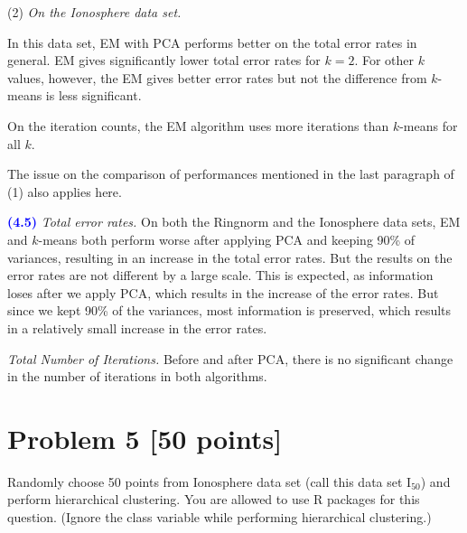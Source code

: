 \documentclass[a4paper,12pt]{article}
\newcommand{\qnum}[1]{\noindent\textcolor{blue}{\textbf{(#1)}}}
\newcommand{\km}{$k$-means }
\begin{document}
\noindent 
(2) \emph{On the Ionosphere data set.}

In this data set, EM with PCA performs better on the total error rates in general. EM gives significantly lower total error rates for $k=2$. For other $k$ values, however, the EM gives better error rates but not the difference from \km is less significant.

On the iteration counts, the EM algorithm uses more iterations than $k$-means for all $k$. 

The issue on the comparison of performances mentioned in the last paragraph of (1) also applies here.
\bigskip\bigskip





\qnum{4.5}
\emph{Total error rates.}
On both the Ringnorm and the Ionosphere data sets, 
EM and $k$-means both perform worse after applying PCA and keeping 90\% of variances, resulting in an increase in the total error rates. But the results on the error rates are not different by a large scale. This is expected, as information loses after we apply PCA, which results in the increase of the error rates. But since we kept 90\% of the variances, most information is preserved, which results in a relatively small increase in the error rates.

\emph{Total Number of Iterations.} 
Before and after PCA, there is no significant change in the number of iterations in both algorithms.































 \newpage
 \section*{Problem 5 [50 points]}  Randomly choose 50 points from Ionosphere data set (call this data set $\text{I}_{50}$) and perform hierarchical clustering. You are allowed to use R packages for this question. (Ignore the class variable while performing hierarchical clustering.)
 \\ 
 
\end{document}
